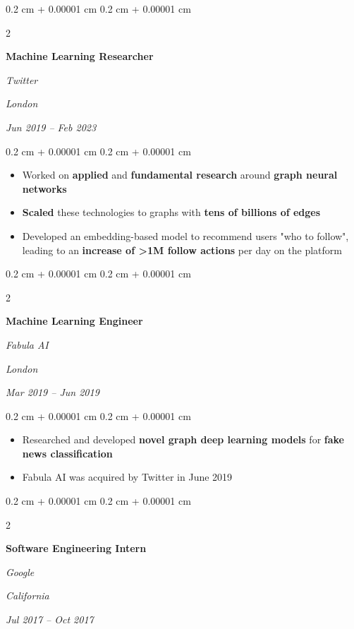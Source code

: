\documentclass[10pt, letterpaper]{article}
\newenvironment{highlights}{
    \begin{itemize}[
        topsep=0.10 cm,
        parsep=0.10 cm,
        partopsep=0pt,
        itemsep=0pt,
        leftmargin=0.4 cm + 10pt
    ]
}{
    \end{itemize}
} %
\newenvironment{onecolentry}{
    \begin{adjustwidth}{
        0.2 cm + 0.00001 cm
    }{
        0.2 cm + 0.00001 cm
    }
}{
    \end{adjustwidth}
} %
\newenvironment{twocolentry}[2][]{
    \onecolentry
    \def\secondColumn{#2}
    \setcolumnwidth{\fill, 4.5 cm}
    \begin{paracol}{2}
}{
    \switchcolumn \raggedleft \secondColumn
    \end{paracol}
    \endonecolentry
} %
\begin{document}
    \vspace{0.2 cm}

    \begin{twocolentry}{
    \textit{London}
        
    \textit{Jun 2019 – Feb 2023}}
        \textbf{Machine Learning Researcher}
        
        \textit{Twitter}
    \end{twocolentry}

    \vspace{0.10 cm}
    \begin{onecolentry}
        \begin{highlights}
            \item Worked on \textbf{applied} and \textbf{fundamental research} around \textbf{graph neural networks}
            \item \textbf{Scaled} these technologies to graphs with \textbf{tens of billions of edges}
            \item Developed an embedding-based model to recommend users "who to follow", leading to an \textbf{increase of >1M follow actions} per day on the platform
        \end{highlights}
    \end{onecolentry}

    \vspace{0.2 cm}

    \begin{twocolentry}{
    \textit{London}
        
    \textit{Mar 2019 – Jun 2019}}
        \textbf{Machine Learning Engineer}
        
        \textit{Fabula AI}
    \end{twocolentry}

    \vspace{0.10 cm}
    \begin{onecolentry}
        \begin{highlights}
            \item Researched and developed \textbf{novel graph deep learning models} for \textbf{fake news classification}
            \item Fabula AI was acquired by Twitter in June 2019
        \end{highlights}
    \end{onecolentry}

    \vspace{0.2 cm}

    \begin{twocolentry}{
    \textit{California}
        
    \textit{Jul 2017 – Oct 2017}}
        \textbf{Software Engineering Intern}
        
        \textit{Google}
    \end{twocolentry}
\end{document}
